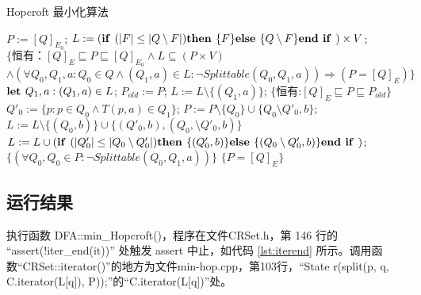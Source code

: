 \begin{algorithm}
    \caption{Hopcroft 最小化算法}\label{al:4-8}
    \small
    \begin{algorithmic}[1]
        \State $P:=[Q]_{E_0}$;
        \State $L:= ( \mbox{\textbf{if }} ( |F| \leq |Q \setminus F | ) \mbox{\textbf{then }} \{F\} \mbox{\textbf{else }} \{ Q \setminus F \} \mbox{\textbf{end if }} ) \times V $;
        \State $\{ \mbox{恒有：} [Q]_E \sqsubseteq P \sqsubseteq [Q]_{E_0} \land L \subseteq (P \times V) $
        \State \quad $ \land (\forall Q_0,Q_1,a:Q_0 \in Q \land (Q_1,a) \in L : \neg Splittable (Q_0,Q_1,a)) \Rightarrow (P=[Q]_E) \} $
            \State $ \mbox{\textbf{let }} Q_1,a:(Q_1,a) \in L $;
            \State $ P_{old} := P $;
            \State $ L := L \setminus \{ (Q_1,a) \} $;
            \State $ \{ \mbox{恒有:} [Q]_E \sqsubseteq P \sqsubseteq P_{old} \} $
                \State $ Q'_0 := \{ p:p \in Q_0 \land T(p,a) \in Q_1 \} $;
                \State $ P:= P \setminus \{ Q_0 \} \cup \{ Q_0 \setminus Q'_0,b \} $;
                       $ L := L \setminus \{ (Q_0,b) \} \cup \{ (Q'_0,b),(Q_0, \setminus Q'_0,b ) \} $
                        \State $L:= L \cup ( \mbox{\textbf{if }} ( |Q'_0| \leq |Q_0 \setminus Q'_0 | ) \mbox{\textbf{then }} \{(Q'_0,b)\} \mbox{\textbf{else }} \{ (Q_0 \setminus Q'_0,b) \} \mbox{\textbf{end if }} ) $;
                    \EndIf
                \EndFor
            \EndFor
            \State $ \{ (\forall Q_0,Q_0 \in P : \neg Splittable(Q_0,Q_1,a)) \} $
        \Until $\{ P = [Q]_E \}$
    \end{algorithmic}
\end{algorithm}


\subsection{运行结果}\label{sec:hopcroft-error}
执行函数 DFA::min\_Hopcroft()，程序在文件CRSet.h，第 146 行的 “assert(!iter\_end(it))” 处触发 assert 中止，如代码 \ref{lst:iterend} 所示。调用函数“CRSet::iterator()”的地方为文件min-hop.cpp，第103行，“State r(split(p, q, C.iterator(L[q]), P));”的“C.iterator(L[q])”处。

